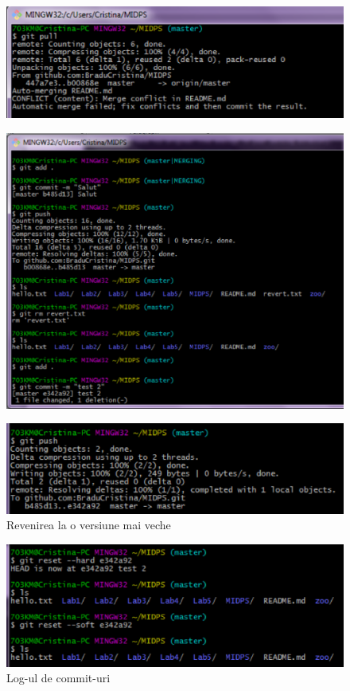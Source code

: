 \documentclass[11pt]{article}
\begin{document}
\begin{figure}[h]
\includegraphics{images/11.eps}
\end{figure}

\begin{figure}[h]
\includegraphics{images/12.eps}
\end{figure}

\begin{figure}[h]
\includegraphics{images/13.eps}
\caption{Revenirea la o versiune mai veche}
\end{figure}

\begin{figure}[h]
\includegraphics{images/14.eps}
\caption{Log-ul de commit-uri}
\end{figure}
\end{document}
